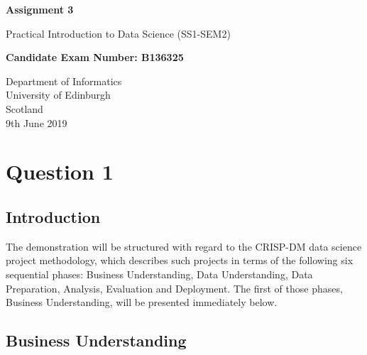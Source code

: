 \documentclass[12pt, oneside, openany]{book}
\begin{document}
    \frontmatter

\begin{titlepage}
   \begin{center}
       \vspace*{1cm}
 
       \textbf{Assignment 3}
 
       \vspace{0.5cm}
        Practical Introduction to Data Science (SS1-SEM2)
 
       \vspace{1.5cm}
 
       \textbf{Candidate Exam Number: B136325}
 
       \vfill
 
       \vspace{0.8cm}
 
       Department of Informatics\\
       University of Edinburgh\\
       Scotland\\
       9th June 2019
 
   \end{center}
\end{titlepage}
    \pagestyle{plain}

    \tableofcontents

    \mainmatter

    \pagestyle{plain}

\setcounter{equation}{0}
\chapter*{Question 1}

\section*{Introduction}
The demonstration will be structured with regard to the CRISP-DM data science project methodology, which describes such projects in terms of the following six sequential phases: Business Understanding, Data Understanding, Data Preparation, Analysis, Evaluation and Deployment. The first of those phases, Business Understanding, will be presented immediately below.

\section*{Business Understanding}
\end{document}

